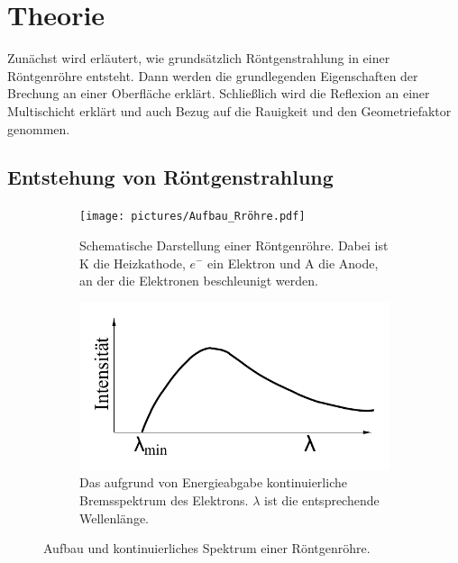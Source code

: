 \section{Theorie}
\label{sec:Theorie}

Zunächst wird erläutert, wie grundsätzlich Röntgenstrahlung in einer Röntgenröhre entsteht.
Dann werden die grundlegenden Eigenschaften der Brechung an einer Oberfläche erklärt.
Schließlich wird die Reflexion an einer Multischicht erklärt und auch Bezug auf die Rauigkeit und den Geometriefaktor genommen.

\subsection{Entstehung von Röntgenstrahlung} \label{sec:Röntgenstrahlung}

\begin{figure}
    \begin{subfigure}{0.48\textwidth}
        \centering
        \texttt{[image: pictures/Aufbau\_Rröhre.pdf]}
        \caption{Schematische Darstellung einer Röntgenröhre\cite{demtroeder2}.
        Dabei ist K die Heizkathode, $e^-$ ein Elektron und A die Anode, an der die Elektronen beschleunigt werden.}
        \label{fig:aufbau}
    \end{subfigure}
    \begin{subfigure}{0.48\textwidth}
        \centering
        \includegraphics[width=\textwidth]{pictures/bremsspektrum.pdf}
        \caption{Das aufgrund von Energieabgabe kontinuierliche Bremsspektrum des Elektrons\cite{v602}.
        $\lambda$ ist die entsprechende Wellenlänge.}
        \label{fig:bremsspektrum}
    \end{subfigure}
    \caption{Aufbau und kontinuierliches Spektrum einer Röntgenröhre.}
\end{figure}

